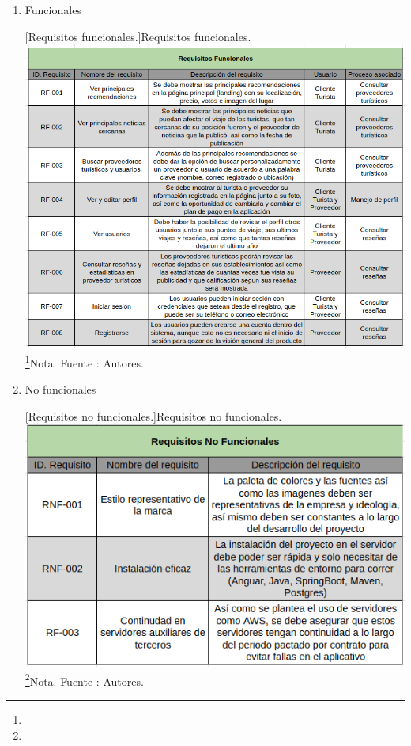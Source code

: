 \begin{enumerate}
    \item Funcionales
        \par\vspace{2mm}
        \begin{minipage}{0.9\textwidth}
        \centering
        [{Requisitos funcionales.}]{Requisitos funcionales.}
        \label{req1}
        \includegraphics[width=1\textwidth]{Content/Images/requisitos.png}
        \footnote{}{Nota. \textup{Fuente : Autores.}}
        \end{minipage}
           
    \item No funcionales
    \par\vspace{2mm}
        \begin{minipage}{0.9\textwidth}
        \centering
        [{Requisitos no funcionales.}]{Requisitos no funcionales.}
        \label{req1}
        \includegraphics[width=1\textwidth]{Content/Images/requisitosNF.png}
        \footnote{}{Nota. \textup{Fuente : Autores.}}
        \end{minipage}
        
\end{enumerate}

